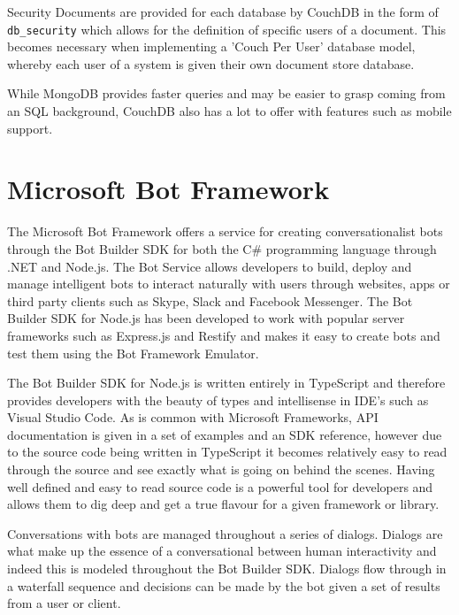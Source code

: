 Security Documents are provided for each database by CouchDB in the form of \texttt{\/db\/\_security} which allows for the definition of specific users of a document. This becomes necessary when implementing a 'Couch Per User' database model, whereby each user of a system is given their own document store database.

While MongoDB provides faster queries and may be easier to grasp coming from an SQL background, CouchDB also has a lot to offer with features such as mobile support\cite{couchvsmongo}.

\section{Microsoft Bot Framework}
The Microsoft Bot Framework\cite{msbotframework} offers a service for creating conversationalist bots through the Bot Builder SDK for both the C\# programming language through .NET and Node.js. The Bot Service allows developers to build, deploy and manage intelligent bots to interact naturally with users through websites, apps or third party clients such as Skype, Slack and Facebook Messenger\cite{msbotframework}. The Bot Builder SDK for Node.js has been developed to work with popular server frameworks such as Express.js\cite{express} and Restify\cite{restify} and makes it easy to create bots and test them using the Bot Framework Emulator\cite{botemulator}.

The Bot Builder SDK for Node.js is written entirely in TypeScript and therefore provides developers with the beauty of types and intellisense in IDE's such as Visual Studio Code\cite{vscode}. As is common with Microsoft Frameworks, API documentation is given in a set of examples and an SDK reference, however due to the source code being written in TypeScript it becomes relatively easy to read through the source and see exactly what is going on behind the scenes. Having well defined and easy to read source code is a powerful tool for developers and allows them to dig deep and get a true flavour for a given framework or library.

Conversations with bots are managed throughout a series of dialogs. Dialogs are what make up the essence of a conversational between human interactivity and indeed this is modeled throughout the Bot Builder SDK. Dialogs flow through in a waterfall sequence and decisions can be made by the bot given a set of results from a user or client. 


